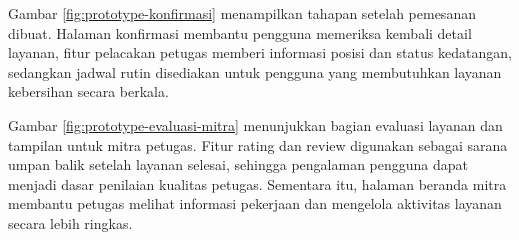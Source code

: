Gambar \ref{fig:prototype-konfirmasi} menampilkan tahapan setelah pemesanan dibuat. Halaman konfirmasi membantu pengguna memeriksa kembali detail layanan, fitur pelacakan petugas memberi informasi posisi dan status kedatangan, sedangkan jadwal rutin disediakan untuk pengguna yang membutuhkan layanan kebersihan secara berkala.

\clearpage

\begin{center}
    \centering
    \hspace{0.08\textwidth}
    \label{fig:prototype-evaluasi-mitra}
\end{center}

Gambar \ref{fig:prototype-evaluasi-mitra} menunjukkan bagian evaluasi layanan dan tampilan untuk mitra petugas. Fitur rating dan review digunakan sebagai sarana umpan balik setelah layanan selesai, sehingga pengalaman pengguna dapat menjadi dasar penilaian kualitas petugas. Sementara itu, halaman beranda mitra membantu petugas melihat informasi pekerjaan dan mengelola aktivitas layanan secara lebih ringkas.

\clearpage
